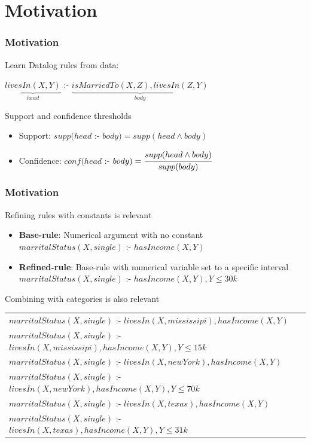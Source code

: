 \documentclass{beamer}
\begin{document}
\section{Motivation}
\begin{frame}
\frametitle{Motivation}
Learn Datalog rules from data:
\begin{center}
  $\underbrace{livesIn(X,Y)}_{head}$ :- $\underbrace{isMarriedTo(X,Z),livesIn(Z,Y)}_{body}$
\end{center}
Support and confidence thresholds
\begin{itemize}
 \item Support: $supp(head$ :- $body)=supp(head \wedge body)$
 \item Confidence: $conf(head$ :- $body)=\cfrac{supp(head \wedge body)}{supp(body)}$ 
\end{itemize}
\end{frame}
\begin{frame}
\frametitle{Motivation}
  Refining rules with constants is relevant
  \begin{itemize}
   \item \textbf{Base-rule}: Numerical argument with no constant \\ \quad 
      $marritalStatus(X,single)$ :- $hasIncome(X,Y)$
   \item \textbf{Refined-rule}: Base-rule with numerical variable set to a specific interval  \\  \quad 
      $marritalStatus(X,single)$ :- $hasIncome(X,Y),Y \leq30k$
  \end{itemize}
  Combining with categories is also relevant
  \begin{fontsize}{8}{8}
    \begin{table}
    \begin{tabular}{l}
      \toprule
      $marritalStatus(X,single)$ :- $livesIn(X,mississipi),hasIncome(X,Y)$ \\
      $marritalStatus(X,single)$ :- $livesIn(X,mississipi),hasIncome(X,Y),Y \leq 15k$ \\ 
      \midrule
      $marritalStatus(X,single)$ :- $livesIn(X,newYork),hasIncome(X,Y)$ \\
      $marritalStatus(X,single)$ :- $livesIn(X,newYork),hasIncome(X,Y),Y \leq 70k$ \\
      \midrule
      $marritalStatus(X,single)$ :- $livesIn(X,texas),hasIncome(X,Y)$ \\
      $marritalStatus(X,single)$ :- $livesIn(X,texas),hasIncome(X,Y),Y \leq 31k$ \\
      \bottomrule
    \end{tabular}
    \end{table}
  \end{fontsize}
\end{frame}
\end{document}
